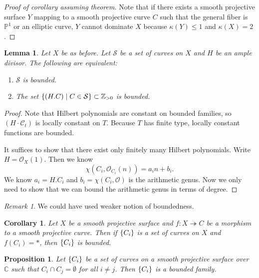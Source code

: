 \documentclass[leqno, openany]{memoir}
\newtheorem{cor}[thm]{Corollary}
\newtheorem{prop}[thm]{Proposition}
\newtheorem{lem}[thm]{Lemma}
\theoremstyle{definition}
\theoremstyle{remark}
\newtheorem{rmk}[thm]{Remark}
\theoremstyle{plain}
\theoremstyle{definition}
\theoremstyle{remark}
\newcommand{\C}{\mathbb{C}}
\newcommand{\Z}{\mathbb{Z}}
\renewcommand{\P}{\mathbb{P}}
\newcommand{\mc}[1]{\mathcal{#1}}
\begin{document}
\begin{proof}[Proof of corollary assuming theorem]
    Note that if there exists a smooth projective surface $Y$ mapping to a smooth projective curve $C$ such that the general fiber is $\P^1$ or an elliptic curve, $Y$ cannot dominate $X$ because $\kappa(Y) \leq 1$ and $\kappa(X) = 2$.
\end{proof}

\begin{lem}
    Let $X$ be as before. Let $\mc{S}$ be a set of curves on $X$ and $H$ be an ample divisor. The following are equivalent:
    \begin{enumerate}[(1)]
        \item $\mc{S}$ is bounded.
        \item The set $\qty{(H . C) \mid C \in \mc{S}} \subset \Z_{>0}$ is bounded.
    \end{enumerate}
\end{lem}

\begin{proof}
    Note that Hilbert polynomials are constant on bounded families, so $(H \cdot \mc{C}_t)$ is locally constant on $T$. Because $T$ has finite type, locally constant functions are bounded.

    It suffices to show that there exist only finitely many Hilbert polynomials. Write $H = \mc{O}_X(1)$. Then we know
    \[ \chi(C_i, \mc{O}_{C_i}(n)) = a_i n + b_i. \]
    We know $a_i = H . C_i$ and $b_i = \chi(C_i, \mc{O})$ is the arithmetic genus. Now we only need to show that we can bound the arithmetic genus in terms of degree.
\end{proof}

\begin{rmk}
    We could have used weaker notion of boundedness.
\end{rmk}

\begin{cor}
    Let $X$ be a smooth projective surface and $f \colon X \twoheadrightarrow C$ be a morphism to a smooth projective curve. Then if $\qty{C_i}$ is a set of curves on $X$ and $f(C_i) = *$, then $\qty{C_i}$ is bounded.
\end{cor}

\begin{prop}
    Let $\qty{C_i}$ be a set of curves on a smooth projective surface over $\C$ such that $C_i \cap C_j = \emptyset$ for all $i \neq j$. Then $\qty{C_i}$ is a bounded family.
\end{prop}
\end{document}
